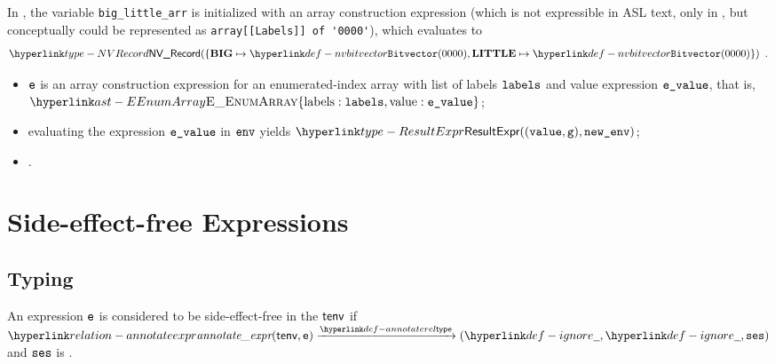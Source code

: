In ,
the variable \verb|big_little_arr| is initialized with an array construction expression
(which is not expressible in ASL text, only in \typedast, but conceptually could be
represented as \verb|array[[Labels]] of '0000'|),
which evaluates to
\[
\NVRecord(\{\vBIG\mapsto\nvbitvector(0000), \vLITTLE\mapsto\nvbitvector(0000)\}) \enspace.
\]

\ProseParagraph
\AllApply
\begin{itemize}
  \item $\ve$ is an array construction expression for an enumerated-index array with
        list of labels $\vlabels$ and value expression $\evalue$,
        that is, \\
        $\EEnumArray\{\EArrayLabels: \vlabels, \EArrayValue: \evalue\}$;
  \item evaluating the expression $\evalue$ in $\env$ yields $\ResultExpr((\vvalue, \vg), \newenv)$\ProseOrAbnormal;
  \item {}.
\end{itemize}

\FormallyParagraph
\begin{mathpar}
\end{mathpar}


\section{Side-effect-free Expressions\label{sec:SideEffectFreeExpressions}}
\subsection{Typing}
An expression $\ve$ is considered to be side-effect-free in the \staticenvironmentterm{} $\tenv$
if $\annotateexpr(\tenv, \ve) \typearrow (\Ignore, \Ignore, \vses)$
and $\vses$ is \readonly{}.

